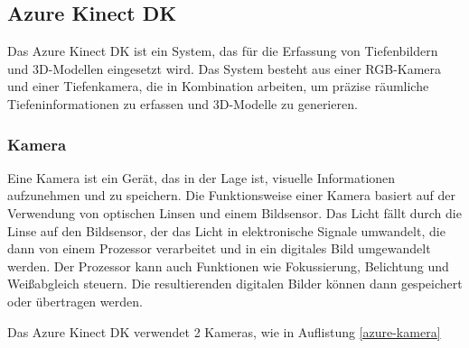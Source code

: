     \subsection{Azure Kinect \ac{DK}}

    Das Azure Kinect DK ist ein System, das für die Erfassung von Tiefenbildern und 3D-Modellen eingesetzt wird. Das System besteht aus einer RGB-Kamera und einer Tiefenkamera, die in Kombination arbeiten, um präzise räumliche Tiefeninformationen zu erfassen und 3D-Modelle zu generieren.
    
    \subsubsection{Kamera} \label{kamera:section}
    Eine Kamera ist ein Gerät, das in der Lage ist, visuelle Informationen aufzunehmen und zu speichern. Die Funktionsweise einer Kamera basiert auf der Verwendung von optischen Linsen und einem Bildsensor. Das Licht fällt durch die Linse auf den Bildsensor, der das Licht in elektronische Signale umwandelt, die dann von einem Prozessor verarbeitet und in ein digitales Bild umgewandelt werden. Der Prozessor kann auch Funktionen wie Fokussierung, Belichtung und Weißabgleich steuern. Die resultierenden digitalen Bilder können dann gespeichert oder übertragen werden. 

    Das Azure Kinect \ac{DK} verwendet 2 Kameras, wie in Auflistung \ref{azure-kamera}

